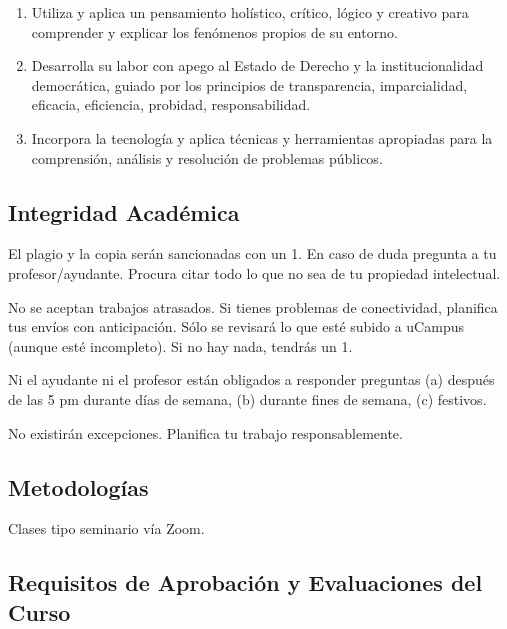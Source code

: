 \documentclass[letterpaper]{article}
\renewenvironment{itemize}{
  \begin{list}{}{
    \setlength{\leftmargin}{1.5em}
  }
}{
  \end{list}
}
\begin{document}
\begin{enumerate}
	\item Utiliza y aplica un pensamiento hol\'istico, cr\'itico, l\'ogico y creativo para comprender y explicar los fen\'omenos propios de su entorno.
	\item Desarrolla su labor con apego al Estado de Derecho y la institucionalidad democr\'atica, guiado por los principios de transparencia, imparcialidad, eficacia, eficiencia, probidad, responsabilidad. 
	\item Incorpora la tecnolog\'ia y aplica t\'ecnicas y herramientas apropiadas para la comprensi\'on, an\'alisis y resoluci\'on de problemas p\'ublicos.
\end{enumerate}


\subsection*{Integridad Acad\'emica}


\begin{itemize}
	\item[$\circ$] El plagio y la copia ser\'an sancionadas con un 1. En caso de duda pregunta a tu profesor/ayudante. Procura citar todo lo que no sea de tu propiedad intelectual.
	\item[$\circ$] No se aceptan trabajos atrasados. Si tienes problemas de conectividad, planifica tus env\'ios con anticipaci\'on. S\'olo se revisar\'a lo que est\'e subido a uCampus (aunque est\'e incompleto). Si no hay nada, tendr\'as un 1.
	\item[$\circ$] Ni el ayudante ni el profesor est\'an obligados a responder preguntas (a) despu\'es de las 5 pm durante d\'ias de semana, (b) durante fines de semana, (c) festivos.
\end{itemize}

\begin{itemize}
\item[{\color{red}\Pointinghand}] No existir\'an excepciones. Planifica tu trabajo responsablemente. 
\end{itemize}




\subsection*{Metodolog\'ias}

Clases tipo seminario v\'ia Zoom.

\subsection*{Requisitos de Aprobaci\'on y Evaluaciones del Curso}
\end{document}
